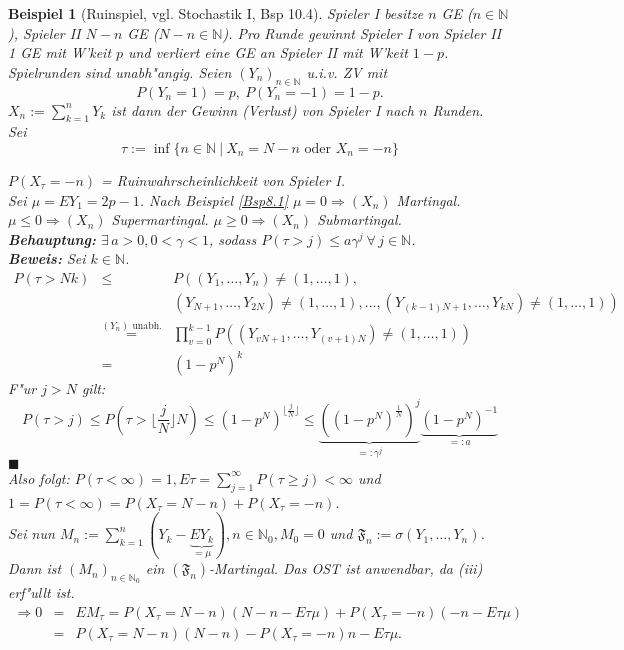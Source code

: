 \documentclass[a4paper,11pt]{book}
\newcommand{\N}{{\mathbb N}}
\def\FF{ \mathfrak{F} }
\newtheorem{Bsp}{Beispiel}[chapter]
\theoremstyle{nonumberplain}
\begin{document}
\begin{Bsp}[Ruinspiel, vgl. Stochastik I, Bsp 10.4] \label{Bsp8.7}
Spieler I besitze $n$ GE ($n \in \N$), Spieler II $N-n$ GE ($N-n \in \N$). Pro Runde gewinnt Spieler I von Spieler II 1 GE mit W'keit $p$ und verliert eine GE an Spieler II mit W'keit $1-p$. Spielrunden sind unabh"angig. Seien $(Y_n)_{n \in \N}$ u.i.v. ZV mit
\[
P(Y_n = 1) = p,\ P(Y_n = -1) = 1-p.
\]
$X_n := \sum\limits_{k=1}^n Y_k$ ist dann der Gewinn (Verlust) von Spieler I nach $n$ Runden.\\
Sei
\[
\tau := \inf\{ n \in \N\ |\ X_n = N-n \text{ oder } X_n = -n \}
\]

$P(X_{\tau} = -n)$ = Ruinwahrscheinlichkeit von Spieler I.\\
Sei $\mu = EY_1 = 2p -1$. Nach Beispiel \ref{Bsp8.1} $\mu = 0 \Rightarrow (X_n)$ Martingal. $\mu \leq 0 \Rightarrow (X_n)$ Supermartingal. $\mu \geq 0 \Rightarrow (X_n)$ Submartingal.\\
\textbf{Behauptung:} $\exists\, a > 0, 0 < \gamma < 1$, sodass $P(\tau > j) \leq a \gamma^j \ \forall\, j \in \N$.\\
\textbf{Beweis:} Sei $k \in \N$.
\begin{eqnarray*}
P(\tau > Nk) & \leq & P\left( (Y_1,\dots,Y_n) \not= (1,\dots,1) , \right. \\
& & \left. (Y_{N+1},\dots,Y_{2N}) \not= (1,\dots,1) , \dots, (Y_{(k-1)N+1},\dots,Y_{kN}) \not= (1,\dots,1) \right) \\
& \stackrel{(Y_n) \text{ unabh.}}{=} & \prod_{v = 0}^{k-1} P\left( (Y_{vN+1},\dots,Y_{(v+1)N}) \not= (1,\dots,1) \right)\\
& = & (1-p^N)^k
\end{eqnarray*}
F"ur $j > N$ gilt:
\[
P(\tau > j) \leq P( \tau > \lfloor \frac{j}{N} \rfloor N) \leq (1-p^N)^{\lfloor \frac{j}{N} \rfloor} \leq \underbrace{\left( (1-p^N)^{\frac1{N}} \right)^j}_{=: \gamma^j} \underbrace{(1-p^N)^{-1}}_{=: a}
\]
\hfill $\blacksquare$ \\
Also folgt: $P(\tau < \infty) = 1, E\tau = \sum\limits_{j=1}^{\infty} P(\tau \geq j) < \infty$ und $1 = P(\tau < \infty) = P(X_{\tau} = N-n) + P(X_{\tau} = -n)$.\\
Sei nun $M_n := \sum\limits_{k=1}^n (Y_k - \underbrace{EY_k}_{=\mu}), n \in \N_0, M_0 = 0$ und $\FF_n := \sigma(Y_1,\dots,Y_n)$.\\
Dann ist $(M_n)_{n \in \N_0}$ ein $(\FF_n)$-Martingal. Das OST ist anwendbar, da (iii) erf"ullt ist.
\begin{eqnarray*}
\Rightarrow 0 & = & EM_{\tau} = P(X_{\tau} = N-n) (N-n-E\tau \mu) + P(X_{\tau} = -n)(-n-E\tau \mu) \\
& = & P(X_{\tau} = N-n)(N-n) - P(X_{\tau} = -n)n -E\tau \mu.
\end{eqnarray*}


\end{Bsp}
\end{document}

